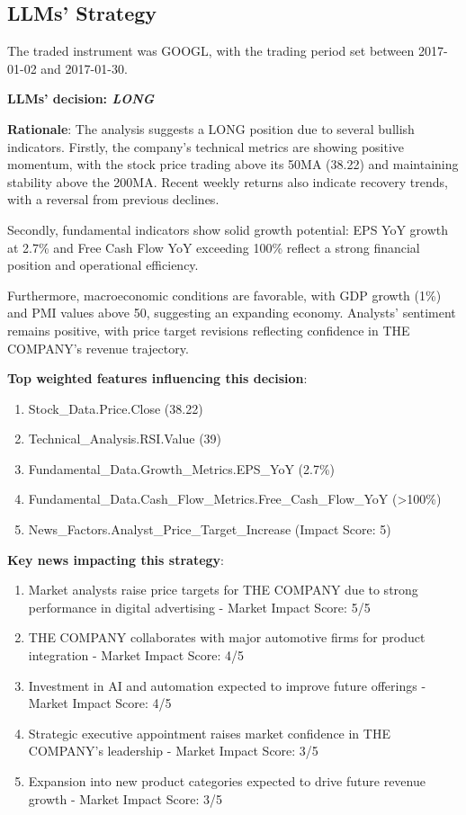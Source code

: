 \documentclass[8pt]{scrartcl}
\begin{document}
\newpage

\subsection*{LLMs' Strategy} \label{strategy5}

The traded instrument was GOOGL, with the trading period set between 2017-01-02 and 2017-01-30.

\textbf{LLMs' decision: \textit{LONG}}

\textbf{Rationale}: The analysis suggests a LONG position due to several bullish indicators. Firstly, the company’s technical metrics are showing positive momentum, with the stock price trading above its 50MA (38.22) and maintaining stability above the 200MA. Recent weekly returns also indicate recovery trends, with a reversal from previous declines.

Secondly, fundamental indicators show solid growth potential: EPS YoY growth at 2.7\% and Free Cash Flow YoY exceeding 100\% reflect a strong financial position and operational efficiency.

Furthermore, macroeconomic conditions are favorable, with GDP growth (1\%) and PMI values above 50, suggesting an expanding economy. Analysts’ sentiment remains positive, with price target revisions reflecting confidence in THE COMPANY’s revenue trajectory.

\textbf{Top weighted features influencing this decision}:
\begin{enumerate}
    \item Stock\_Data.Price.Close (38.22)
    \item Technical\_Analysis.RSI.Value (39)
    \item Fundamental\_Data.Growth\_Metrics.EPS\_YoY (2.7\%)
    \item Fundamental\_Data.Cash\_Flow\_Metrics.Free\_Cash\_Flow\_YoY (>100\%)
    \item News_Factors.Analyst\_Price\_Target\_Increase (Impact Score: 5)
\end{enumerate}

\textbf{Key news impacting this strategy}:
\begin{enumerate}
    \item Market analysts raise price targets for THE COMPANY due to strong performance in digital advertising - Market Impact Score: 5/5
    \item THE COMPANY collaborates with major automotive firms for product integration - Market Impact Score: 4/5
    \item Investment in AI and automation expected to improve future offerings - Market Impact Score: 4/5
    \item Strategic executive appointment raises market confidence in THE COMPANY’s leadership - Market Impact Score: 3/5
    \item Expansion into new product categories expected to drive future revenue growth - Market Impact Score: 3/5
\end{enumerate}
\end{document}
